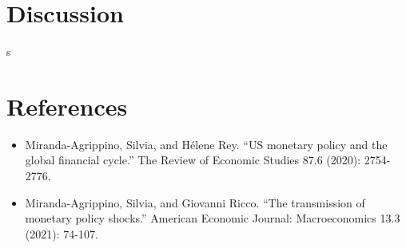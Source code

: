 \documentclass[10pt,a4paper,draft]{article}
\begin{document}
\section{Discussion}


s


















\section{References}
\begin{itemize}
    \item Miranda-Agrippino, Silvia, and Hélene Rey. \enquote{US monetary policy and the global financial cycle.} The Review of Economic Studies 87.6 (2020): 2754-2776.
    \item Miranda-Agrippino, Silvia, and Giovanni Ricco. \enquote{The transmission of monetary policy shocks.} American Economic Journal: Macroeconomics 13.3 (2021): 74-107.
\end{itemize}
\end{document}
